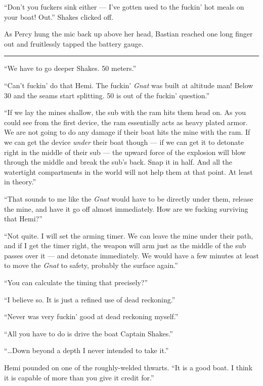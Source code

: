\documentclass[
]{scrbook}
\begin{document}
``Don't you fuckers sink either --- I've gotten used to the fuckin' hot
meals on your boat! Out.'' Shakes clicked off.

As Percy hung the mic back up above her head, Bastian reached one long
finger out and fruitlessly tapped the battery gauge.

\begin{center}\rule{0.5\linewidth}{0.5pt}\end{center}

``We have to go deeper Shakes. 50 meters.''

``Can't fuckin' do that Hemi. The fuckin' \emph{Gnat} was built at
altitude man! Below 30 and the seams start splitting. 50 is out of the
fuckin' question.''

``If we lay the mines shallow, the sub with the ram hits them head on.
As you could see from the first device, the ram essentially acts as
heavy plated armor. We are not going to do any damage if their boat hits
the mine with the ram. If we can get the device \emph{under} their boat
though --- if we can get it to detonate right in the middle of their sub
--- the upward force of the explosion will blow through the middle and
break the sub's back. Snap it in half. And all the watertight
compartments in the world will not help them at that point. At least in
theory.''

``That sounds to me like the \emph{Gnat} would have to be directly under
them, release the mine, and have it go off almost immediately. How are
we fucking surviving that Hemi?''

``Not quite. I will set the arming timer. We can leave the mine under
their path, and if I get the timer right, the weapon will arm just as
the middle of the sub passes over it --- and detonate immediately. We
would have a few minutes at least to move the \emph{Gnat} to safety,
probably the surface again.''

``You can calculate the timing that precisely?''

``I believe so. It is just a refined use of dead reckoning.''

``Never was very fuckin' good at dead reckoning myself.''

``All you have to do is drive the boat Captain Shakes.''

``\ldots Down beyond a depth I never intended to take it.''

Hemi pounded on one of the roughly-welded thwarts. ``It is a good boat.
I think it is capable of more than you give it credit for.''
\end{document}
